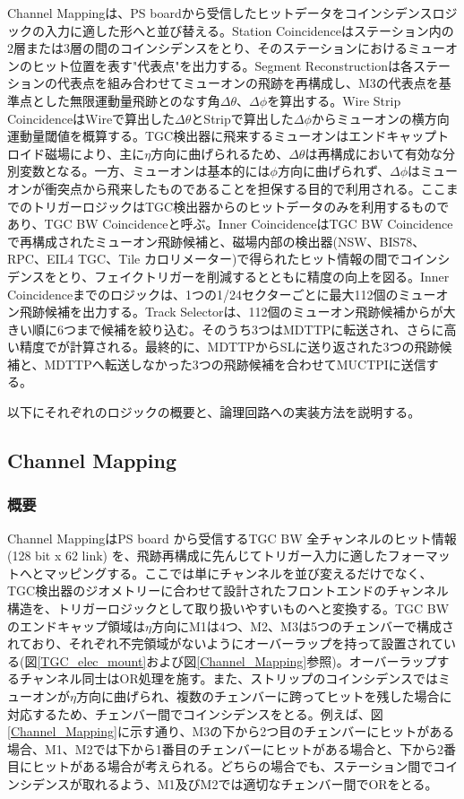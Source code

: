Channel Mappingは、PS boardから受信したヒットデータをコインシデンスロジックの入力に適した形へと並び替える。Station Coincidenceはステーション内の2層または3層の間のコインシデンスをとり、そのステーションにおけるミューオンのヒット位置を表す"代表点"を出力する。Segment Reconstructionは各ステーションの代表点を組み合わせてミューオンの飛跡を再構成し、M3の代表点を基準点とした無限運動量飛跡とのなす角$\Delta\theta$、$\Delta\phi$を算出する。Wire Strip CoincidenceはWireで算出した$\Delta\theta$とStripで算出した$\Delta\phi$からミューオンの横方向運動量閾値\pt を概算する。TGC検出器に飛来するミューオンはエンドキャップトロイド磁場により、主に$\eta$方向に曲げられるため、$\Delta\theta$は\pt 再構成において有効な分別変数となる。一方、ミューオンは基本的には$\phi$方向に曲げられず、$\Delta\phi$はミューオンが衝突点から飛来したものであることを担保する目的で利用される。ここまでのトリガーロジックはTGC検出器からのヒットデータのみを利用するものであり、TGC BW Coincidenceと呼ぶ。Inner CoincidenceはTGC BW Coincidenceで再構成されたミューオン飛跡候補と、磁場内部の検出器(NSW、BIS78、RPC、EIL4 TGC、Tile カロリメーター)で得られたヒット情報の間でコインシデンスをとり、フェイクトリガーを削減するとともに\pt 精度の向上を図る。Inner Coincidenceまでのロジックは、1つの1/24セクターごとに最大112個のミューオン飛跡候補を出力する。Track Selectorは、112個のミューオン飛跡候補から\pt が大きい順に6つまで候補を絞り込む。そのうち3つはMDTTPに転送され、さらに高い精度で\pt が計算される。最終的に、MDTTPからSLに送り返された3つの飛跡候補と、MDTTPへ転送しなかった3つの飛跡候補を合わせてMUCTPIに送信する。


以下にそれぞれのロジックの概要と、論理回路への実装方法を説明する。

\subsection{Channel Mapping}
\subsubsection*{概要}
Channel MappingはPS board から受信するTGC BW 全チャンネルのヒット情報 (128 bit x 62 link) を、飛跡再構成に先んじてトリガー入力に適したフォーマットへとマッピングする。ここでは単にチャンネルを並び変えるだけでなく、TGC検出器のジオメトリーに合わせて設計されたフロントエンドのチャンネル構造を、トリガーロジックとして取り扱いやすいものへと変換する。TGC BW のエンドキャップ領域は$\eta$方向にM1は4つ、M2、M3は5つのチェンバーで構成されており、それぞれ不完領域がないようにオーバーラップを持って設置されている(図\ref{TGC_elec_mount}および図\ref{Channel_Mapping}参照)。オーバーラップするチャンネル同士はOR処理を施す。また、ストリップのコインシデンスではミューオンが$\eta$方向に曲げられ、複数のチェンバーに跨ってヒットを残した場合に対応するため、チェンバー間でコインシデンスをとる。例えば、図\ref{Channel_Mapping}に示す通り、M3の下から2つ目のチェンバーにヒットがある場合、M1、M2では下から1番目のチェンバーにヒットがある場合と、下から2番目にヒットがある場合が考えられる。どちらの場合でも、ステーション間でコインシデンスが取れるよう、M1及びM2では適切なチェンバー間でORをとる。


